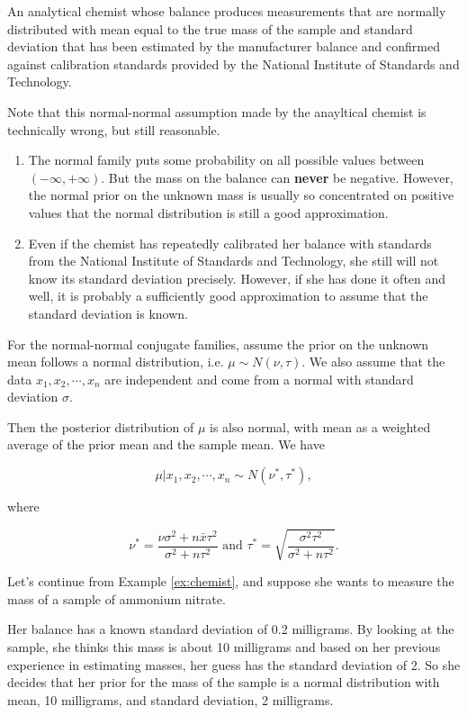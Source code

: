 \documentclass[]{book}
\theoremstyle{definition}
\theoremstyle{definition}
\theoremstyle{definition}
\theoremstyle{remark}
\let\BeginKnitrBlock\begin \let\EndKnitrBlock\end
\begin{document}
\BeginKnitrBlock{example}
\protect\hypertarget{exm:chemist}{}{\label{exm:chemist} }An analytical
chemist whose balance produces measurements that are normally
distributed with mean equal to the true mass of the sample and standard
deviation that has been estimated by the manufacturer balance and
confirmed against calibration standards provided by the National
Institute of Standards and Technology.

Note that this normal-normal assumption made by the anayltical chemist
is technically wrong, but still reasonable.

\begin{enumerate}
\def\labelenumi{\arabic{enumi}.}
\item
  The normal family puts some probability on all possible values between
  \((-\infty,+\infty)\). But the mass on the balance can \textbf{never}
  be negative. However, the normal prior on the unknown mass is usually
  so concentrated on positive values that the normal distribution is
  still a good approximation.
\item
  Even if the chemist has repeatedly calibrated her balance with
  standards from the National Institute of Standards and Technology, she
  still will not know its standard deviation precisely. However, if she
  has done it often and well, it is probably a sufficiently good
  approximation to assume that the standard deviation is known.
\end{enumerate}
\EndKnitrBlock{example}

For the normal-normal conjugate families, assume the prior on the
unknown mean follows a normal distribution, i.e.
\(\mu \sim N(\nu, \tau)\). We also assume that the data
\(x_1,x_2,\cdots,x_n\) are independent and come from a normal with
standard deviation \(\sigma\).

Then the posterior distribution of \(\mu\) is also normal, with mean as
a weighted average of the prior mean and the sample mean. We have

\[\mu|x_1,x_2,\cdots,x_n \sim N(\nu^*, \tau^*),\]

where

\[\nu^* = \frac{\nu\sigma^2 + n\bar{x}\tau^2}{\sigma^2 + n\tau^2} \text{ and } \tau^* = \sqrt{\frac{\sigma^2\tau^2}{\sigma^2 + n\tau^2}}.\]

Let's continue from Example \ref{ex:chemist}, and suppose she wants to
measure the mass of a sample of ammonium nitrate.

Her balance has a known standard deviation of 0.2 milligrams. By looking
at the sample, she thinks this mass is about 10 milligrams and based on
her previous experience in estimating masses, her guess has the standard
deviation of 2. So she decides that her prior for the mass of the sample
is a normal distribution with mean, 10 milligrams, and standard
deviation, 2 milligrams.
\end{document}
